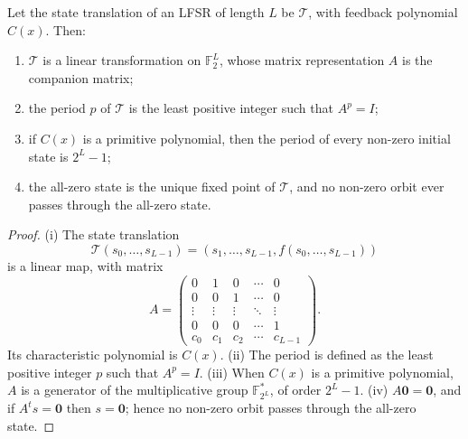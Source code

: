 \begin{lemma}\label{lem:lfsr_period}
Let the state translation of an LFSR of length \(L\) be \(\mathcal T\), with feedback polynomial \(C(x)\). Then:
\begin{enumerate}[label=(\roman*)]
    \item \(\mathcal T\) is a linear transformation on \(\mathbb F_2^L\), whose matrix representation \(A\) is the companion matrix;
    \item the period \(p\) of \(\mathcal T\) is the least positive integer such that \(A^p=I\);
    \item if \(C(x)\) is a primitive polynomial, then the period of every non-zero initial state is \(2^L-1\);
    \item the all-zero state is the unique fixed point of \(\mathcal T\), and no non-zero orbit ever passes through the all-zero state.
\end{enumerate}
\end{lemma}

\begin{proof}
(i) The state translation
\[
\mathcal T(s_0,\dots,s_{L-1})=(s_1,\dots,s_{L-1},f(s_0,\dots,s_{L-1}))
\]
is a linear map, with matrix
\[
A=\begin{pmatrix}
0&1&0&\cdots&0\\
0&0&1&\cdots&0\\
\vdots&\vdots&\vdots&\ddots&\vdots\\
0&0&0&\cdots&1\\
c_0&c_1&c_2&\cdots&c_{L-1}
\end{pmatrix}.
\]
Its characteristic polynomial is \(C(x)\).
(ii) The period is defined as the least positive integer \(p\) such that \(A^p=I\).
(iii) When \(C(x)\) is a primitive polynomial, \(A\) is a generator of the multiplicative group \(\mathbb F_{2^L}^*\), of order \(2^L-1\).
(iv) \(A\mathbf 0=\mathbf 0\), and if \(A^t s=\mathbf 0\) then \(s=\mathbf 0\); hence no non-zero orbit passes through the all-zero state.
\end{proof}

